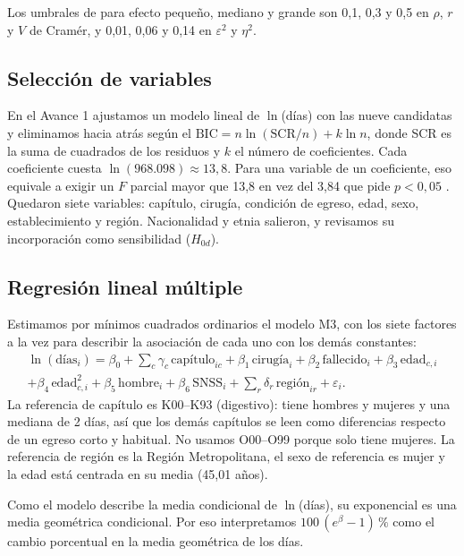 \documentclass[10.5pt,a4paper,headings=small,abstract=false,bibliography=totoc,listof=totoc]{scrartcl}
\newcommand{\pct}{\,\%}
\begin{document}
Los umbrales de \citet{cohen1988} para efecto pequeño, mediano y grande son 0,1, 0,3 y 0,5 en $\rho$, $r$ y $V$ de Cramér, y 0,01, 0,06 y 0,14 en $\varepsilon^2$ y $\eta^2$.

\subsection{Selección de variables}

En el Avance 1 ajustamos un modelo lineal de $\ln$(días) con las nueve candidatas y eliminamos hacia atrás según el $\mathrm{BIC}=n\ln(\mathrm{SCR}/n)+k\ln n$, donde SCR es la suma de cuadrados de los residuos y $k$ el número de coeficientes. Cada coeficiente cuesta $\ln(968.098)\approx 13{,}8$. Para una variable de un coeficiente, eso equivale a exigir un $F$ parcial mayor que 13,8 en vez del 3,84 que pide $p<0{,}05$ \citep{raftery1995}. Quedaron siete variables: capítulo, cirugía, condición de egreso, edad, sexo, establecimiento y región. Nacionalidad y etnia salieron, y revisamos su incorporación como sensibilidad ($H_{0d}$).

\subsection{Regresión lineal múltiple}

Estimamos por mínimos cuadrados ordinarios el modelo M3, con los siete factores a la vez para describir la asociación de cada uno con los demás constantes:
\begin{multline*}
\ln(\text{días}_i)=\beta_0+\sum_c\gamma_c\,\text{capítulo}_{ic}+\beta_1\,\text{cirugía}_i+\beta_2\,\text{fallecido}_i+\beta_3\,\text{edad}_{c,i}\\
+\beta_4\,\text{edad}_{c,i}^2+\beta_5\,\text{hombre}_i+\beta_6\,\text{SNSS}_i+\sum_r\delta_r\,\text{región}_{ir}+\varepsilon_i .
\end{multline*}
La referencia de capítulo es K00--K93 (digestivo): tiene hombres y mujeres y una mediana de 2 días, así que los demás capítulos se leen como diferencias respecto de un egreso corto y habitual. No usamos O00--O99 porque solo tiene mujeres. La referencia de región es la Región Metropolitana, el sexo de referencia es mujer y la edad está centrada en su media (45,01 años).

Como el modelo describe la media condicional de $\ln$(días), su exponencial es una media geométrica condicional. Por eso interpretamos $100\,(e^{\beta}-1)\pct{}$ como el cambio porcentual en la media geométrica de los días.
\end{document}
